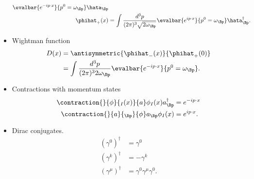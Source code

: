 \begin{itemize}
\begin{equation}
\begin{aligned}
\evalbar{
e^{-i p \cdot x} }{p^0 = \omega_\Bp} \hata_\Bp \\
\phihat_{+}(x) &=
\int \frac{d^3 p}{(2 \pi)^3 \sqrt{2 \omega_\Bp}}
\evalbar{
e^{i p \cdot x} }{p^0 = \omega_\Bp} \hata^\dagger_\Bp.
\end{aligned}
\end{equation}
\item Wightman function
\begin{equation}\label{eqn:usefulFormulas:640}
\begin{aligned}
D(x)
&= \antisymmetric{\phihat_{-}(x)}{\phihat_{+}(0)}
\\&=
\int \frac{d^3 p}{(2 \pi)^3 2 \omega_\Bp}
\evalbar{ e^{-i p \cdot x} }{p^0 = \omega_\Bp}.
\end{aligned}
\end{equation}
\item Contractions with momentum states
\begin{equation}\label{eqn:usefulFormulas:660}
\begin{aligned}
\contraction{}{\phi}{{}_I(x)}{a}
\phi_I(x) a^\dagger_{\Bp}
&= e^{-i p \cdot x} \\
\contraction{}{a}{{}_\Bp}{\phi}
a_\Bp \phi_I(x)
&= e^{i p \cdot x}.
\end{aligned}
\end{equation}
\item Dirac conjugates.
\begin{equation}\label{eqn:usefulFormulas:680}
\begin{aligned}
(\gamma^0)^\dagger &= \gamma^0 \\
(\gamma^k)^\dagger &= - \gamma^k \\
(\gamma^\mu)^\dagger &= \gamma^0 \gamma^\mu \gamma^0.
\end{aligned}
\end{equation}

\end{itemize}
